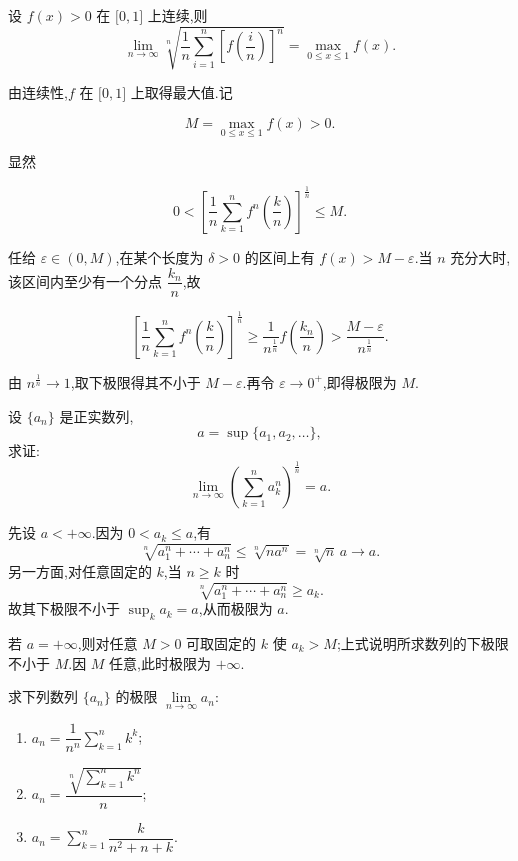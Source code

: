 \begin{example}[\markstar]
  设 $f(x)>0$ 在 $\lbrack 0,1\rbrack$ 上连续,则
  \[
    \displaystyle\lim\limits_{n\to\infty}
    \sqrt[n]{\dfrac{1}{n}\sum\limits_{i=1}^n\left[f\left(\dfrac{i}{n}\right)\right]^n}
    =
    \max_{0\leq x\leq1}f(x).
  \]
\end{example}
\exampleblank

\begin{solution}

  由连续性,$f$ 在 $\lbrack0,1\rbrack$ 上取得最大值.记

  \[
    M=\max\limits_{0\leq x\leq1}f(x)>0.
  \]

  显然

  \[
    0<\left[\dfrac{1}{n}\sum\limits_{k=1}^n f^n\left(\dfrac{k}{n}\right)\right]^{\frac{1}{n}}
    \leq M.
  \]

  任给 $\varepsilon\in(0,M)$,在某个长度为 $\delta>0$ 的区间上有
  $f(x)>M-\varepsilon$.当 $n$ 充分大时,该区间内至少有一个分点
  $\dfrac{k_n}{n}$,故

  \[
    \left[\dfrac{1}{n}\sum\limits_{k=1}^n f^n\left(\dfrac{k}{n}\right)\right]^{\frac{1}{n}}
    \geq\dfrac{1}{n^{\frac{1}{n}}}f\left(\dfrac{k_n}{n}\right)
    >\dfrac{M-\varepsilon}{n^{\frac{1}{n}}}.
  \]

  由 $n^{\frac{1}{n}}\to1$,取下极限得其不小于 $M-\varepsilon$.再令
  $\varepsilon\to0^+$,即得极限为 $M$.

\end{solution}

\begin{example}[\markstar]
  设 $\{a_n\}$ 是正实数列,
  \[
    a=\sup\{a_1,a_2,\ldots\},
  \]
  求证:
  \[
    \displaystyle\lim\limits_{n\to\infty}\left(\sum\limits_{k=1}^n a_k^n\right)^{\frac{1}{n}}=a.
  \]
\end{example}
\exampleblank

\begin{solution}
  先设 $a<+\infty$.因为 $0<a_k\leq a$,有
  \[
    \sqrt[n]{a_1^n+\cdots+a_n^n}\leq\sqrt[n]{na^n}=\sqrt[n]{n}\,a\longrightarrow a.
  \]
  另一方面,对任意固定的 $k$,当 $n\geq k$ 时
  \[
    \sqrt[n]{a_1^n+\cdots+a_n^n}\geq a_k.
  \]
  故其下极限不小于 $\sup_k a_k=a$,从而极限为 $a$.

  若 $a=+\infty$,则对任意 $M>0$ 可取固定的 $k$ 使 $a_k>M$;上式说明所求数列的下极限不小于
  $M$.因 $M$ 任意,此时极限为 $+\infty$.
\end{solution}

\begin{example}
  求下列数列 $\{a_n\}$ 的极限 $\displaystyle \lim\limits_{n\to\infty}a_n$:
  \begin{enumerate}
    \item $\displaystyle a_n=\dfrac{1}{n^n}\sum\limits_{k=1}^n k^k$;
    \item $\displaystyle a_n=\dfrac{\displaystyle\sqrt[n]{\sum\limits_{k=1}^n k^n}}{n}$;
    \item $\displaystyle a_n=\sum\limits_{k=1}^n\dfrac{k}{n^2+n+k}$.
  \end{enumerate}
\end{example}
\exampleblank

